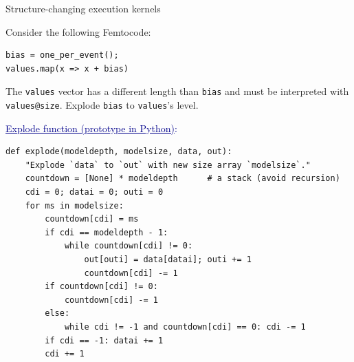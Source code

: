 \documentclass{beamer}
\begin{document}
\begin{frame}[fragile]{Structure-changing execution kernels}
\scriptsize

\vspace{0.25 cm}
Consider the following Femtocode:
\begin{center}
\begin{minipage}{0.5\linewidth}
\begin{verbatim}
bias = one_per_event();
values.map(x => x + bias)
\end{verbatim}
\end{minipage}
\end{center}

The {\tt values} vector has a different length than {\tt bias} and must be interpreted with {\tt values@size}. Explode {\tt bias} to {\tt values}'s level.

\vspace{0.25 cm}
\textcolor{darkblue}{\small \underline{Explode function (prototype in Python)}:}
\begin{verbatim}
def explode(modeldepth, modelsize, data, out):
    "Explode `data` to `out` with new size array `modelsize`."
    countdown = [None] * modeldepth      # a stack (avoid recursion)
    cdi = 0; datai = 0; outi = 0
    for ms in modelsize:
        countdown[cdi] = ms
        if cdi == modeldepth - 1:
            while countdown[cdi] != 0:
                out[outi] = data[datai]; outi += 1
                countdown[cdi] -= 1
        if countdown[cdi] != 0:
            countdown[cdi] -= 1
        else:
            while cdi != -1 and countdown[cdi] == 0: cdi -= 1
        if cdi == -1: datai += 1
        cdi += 1
\end{verbatim}
\end{frame}
\end{document}
